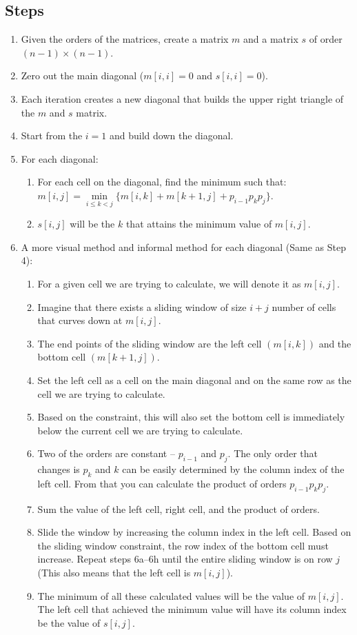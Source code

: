 \subsection*{Steps}
\begin{enumerate}
	\item Given the orders of the matrices, create a matrix $m$ and a matrix $s$ of order $(n-1) \times (n-1)$.
	\item Zero out the main diagonal ($m[i,i] = 0$ and $s[i,i] = 0$).
	\item Each iteration creates a new diagonal that builds the upper right triangle of the $m$ and $s$ matrix.
	\item Start from the $i = 1$ and build down the diagonal.
	\item For each diagonal:
	\begin{enumerate}
		\item For each cell on the diagonal, find the minimum such that:\\
			$m[i,j] = \min\limits_{i\leq k < j} \{ m[i,k] + m[k+1,j] + p_{i-1}p_kp_j \}$. 
		\item $s[i,j]$ will be the $k$ that attains the minimum value of $m[i,j]$.
	\end{enumerate}
	\item A more visual method and informal method for each diagonal (Same as Step 4):
	\begin{enumerate}
		\item For a given cell we are trying to calculate, we will denote it as $m[i,j]$.
		\item Imagine that there exists a sliding window of size $i + j$ number of cells that curves down at $m[i,j]$.
		\item The end points of the sliding window are the left cell $(m[i,k])$ and the bottom cell $(m[k+1,j])$.
		\item Set the left cell as a cell on the main diagonal and on the same row as the cell we are trying to calculate. 
		\item Based on the constraint, this will also set the bottom cell is immediately below the current cell we are trying to calculate.
		\item Two of the orders are constant -- $p_{i-1}$ and $p_j$. The only order that changes is $p_k$ and $k$ can be easily determined by the column index of the left cell. From that you can calculate the product of orders $p_{i-1}p_k p_j$.
		\item Sum the value of the left cell, right cell, and the product of orders.
		\item Slide the window by increasing the column index in the left cell. Based on the sliding window constraint, the row index of the bottom cell must increase. Repeat steps 6a--6h until the entire sliding window is on row $j$ (This also means that the left cell is $m[i,j]$).
		\item The minimum of all these calculated values will be the value of $m[i,j]$. The left cell that achieved the minimum value will have its column index be the value of $s[i,j]$.
	\end{enumerate}
\end{enumerate}

